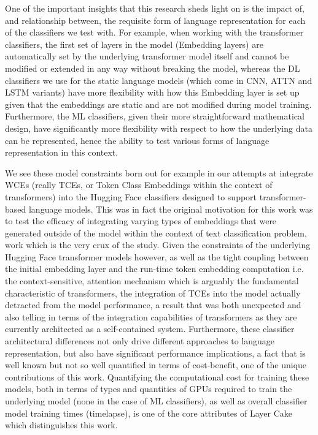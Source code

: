 \documentclass[final]{clv2025}
\begin{document}
One of the important insights that this research sheds light on is the impact of, and relationship between, the requisite form of language representation for each of the classifiers we test with. For example, when working with the transformer classifiers, the first set of layers in the model (Embedding layers) are automatically set by the underlying transformer model itself and cannot be modified or extended in any way without breaking the model, whereas the DL classifiers we use for the static language models (which come in CNN, ATTN and LSTM variants) have more flexibility with how this Embedding layer is set up given that the embeddings are static and are not modified during model training. Furthermore, the ML classifiers, given their more straightforward mathematical design, have significantly more flexibility with respect to how the underlying data can be represented, hence the ability to test various forms of language representation in this context. 

We see these model constraints born out for example in our attempts at integrate WCEs (really TCEs, or Token Class Embeddings within the context of transformers) into the Hugging Face classifiers designed to support transformer-based language models. This was in fact the original motivation for this work was to test the efficacy of integrating varying types of embeddings that were generated outside of the model within the context of text classification problem, work which is the very crux of the \cite{moreo} study. Given the constraints of the underlying Hugging Face transformer models however, as well as the tight coupling between the initial embedding layer and the run-time token embedding computation i.e. the context-sensitive, attention mechanism which is arguably the fundamental characteristic of transformers, the integration of TCEs into the model actually detracted from the model performance, a result that was both unexpected and also telling in terms of the integration capabilities of transformers as they are currently architected as a self-contained system. Furthermore, these classifier architectural differences not only drive different approaches to language representation, but also have significant performance implications, a fact that is well known but not so well quantified in terms of cost-benefit, one of the unique contributions of this work. Quantifying the computational cost for training these models, both in terms of types and quantities of GPUs required to train the underlying model (none in the case of ML classifiers), as well as overall classifier model training times (timelapse), is one of the core attributes of Layer Cake which distinguishes this work.
\end{document}
